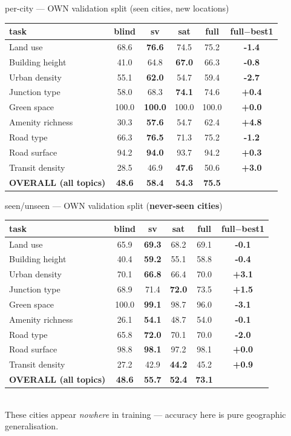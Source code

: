 \documentclass[aspectratio=169]{beamer}
\begin{document}
\begin{frame}{per-city --- OWN validation split (seen cities, new locations)}
\centering\footnotesize
\begin{tabular}{lcccc>{\bfseries}c}
\toprule
task & blind & sv & sat & full & full$-$best1 \\
\midrule
Land use & 68.6 & \textbf{76.6} & 74.5 & 75.2 & \textcolor{bad}{-1.4} \\
Building height & 41.0 & 64.8 & \textbf{67.0} & 66.3 & -0.8 \\
Urban density & 55.1 & \textbf{62.0} & 54.7 & 59.4 & \textcolor{bad}{-2.7} \\
Junction type & 58.0 & 68.3 & \textbf{74.1} & 74.6 & +0.4 \\
Green space & 100.0 & \textbf{100.0} & 100.0 & 100.0 & +0.0 \\
Amenity richness & 30.3 & \textbf{57.6} & 54.7 & 62.4 & \textcolor{good}{+4.8} \\
Road type & 66.3 & \textbf{76.5} & 71.3 & 75.2 & \textcolor{bad}{-1.2} \\
Road surface & 94.2 & \textbf{94.0} & 93.7 & 94.2 & +0.3 \\
Transit density & 28.5 & 46.9 & \textbf{47.6} & 50.6 & \textcolor{good}{+3.0} \\
\midrule
\textbf{OVERALL (all topics)} & \textbf{48.6} & \textbf{58.4} & \textbf{54.3} & \textbf{75.5} & \\
\bottomrule
\end{tabular}
\end{frame}

\begin{frame}{seen/unseen --- OWN validation split (\textbf{never-seen cities})}
\centering\footnotesize
\begin{tabular}{lcccc>{\bfseries}c}
\toprule
task & blind & sv & sat & full & full$-$best1 \\
\midrule
Land use & 65.9 & \textbf{69.3} & 68.2 & 69.1 & -0.1 \\
Building height & 40.4 & \textbf{59.2} & 55.1 & 58.8 & -0.4 \\
Urban density & 70.1 & \textbf{66.8} & 66.4 & 70.0 & \textcolor{good}{+3.1} \\
Junction type & 68.9 & 71.4 & \textbf{72.0} & 73.5 & \textcolor{good}{+1.5} \\
Green space & 100.0 & \textbf{99.1} & 98.7 & 96.0 & \textcolor{bad}{-3.1} \\
Amenity richness & 26.1 & \textbf{54.1} & 48.7 & 54.0 & -0.1 \\
Road type & 65.8 & \textbf{72.0} & 70.1 & 70.0 & \textcolor{bad}{-2.0} \\
Road surface & 98.8 & \textbf{98.1} & 97.2 & 98.1 & +0.0 \\
Transit density & 27.2 & 42.9 & \textbf{44.2} & 45.2 & +0.9 \\
\midrule
\textbf{OVERALL (all topics)} & \textbf{48.6} & \textbf{55.7} & \textbf{52.4} & \textbf{73.1} & \\
\bottomrule
\end{tabular}\\[4pt]
\footnotesize These cities appear \emph{nowhere} in training --- accuracy here is pure geographic generalisation.
\end{frame}
\end{document}
